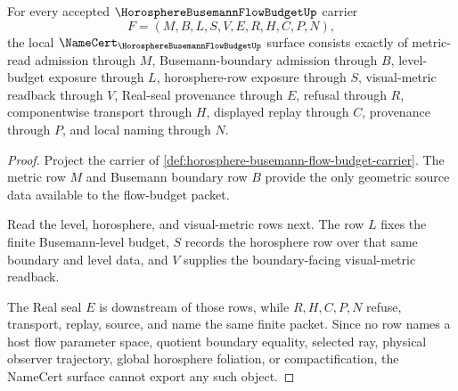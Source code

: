 \begin{theorem}
\label{thm:horosphere-busemann-flow-budget-namecert-surface}
For every accepted $\HorosphereBusemannFlowBudgetUp$ carrier
$$
F=(M,B,L,S,V,E,R,H,C,P,N),
$$
the local $\NameCert_{\HorosphereBusemannFlowBudgetUp}$ surface consists exactly of metric-read admission through $M$, Busemann-boundary admission through $B$, level-budget exposure through $L$, horosphere-row exposure through $S$, visual-metric readback through $V$, Real-seal provenance through $E$, refusal through $R$, componentwise transport through $H$, displayed replay through $C$, provenance through $P$, and local naming through $N$.
\end{theorem}
\begin{proof}
Project the carrier of \autoref{def:horosphere-busemann-flow-budget-carrier}. The metric row $M$ and Busemann boundary row $B$ provide the only geometric source data available to the flow-budget packet.

Read the level, horosphere, and visual-metric rows next. The row $L$ fixes the finite Busemann-level budget, $S$ records the horosphere row over that same boundary and level data, and $V$ supplies the boundary-facing visual-metric readback.

The Real seal $E$ is downstream of those rows, while $R,H,C,P,N$ refuse, transport, replay, source, and name the same finite packet. Since no row names a host flow parameter space, quotient boundary equality, selected ray, physical observer trajectory, global horosphere foliation, or compactification, the NameCert surface cannot export any such object.
\end{proof}

